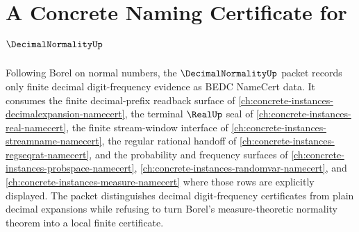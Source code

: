 \chapter{A Concrete Naming Certificate for $\DecimalNormalityUp$}
\label{ch:concrete-instances-decimalnormality-namecert}

Following Borel on normal numbers, the $\DecimalNormalityUp$ packet records
only finite decimal digit-frequency evidence as BEDC NameCert data. It consumes
the finite decimal-prefix readback surface of
\autoref{ch:concrete-instances-decimalexpansion-namecert}, the terminal
$\RealUp$ seal of \autoref{ch:concrete-instances-real-namecert}, the finite
stream-window interface of \autoref{ch:concrete-instances-streamname-namecert},
the regular rational handoff of
\autoref{ch:concrete-instances-regseqrat-namecert}, and the probability and
frequency surfaces of \autoref{ch:concrete-instances-probspace-namecert},
\autoref{ch:concrete-instances-randomvar-namecert}, and
\autoref{ch:concrete-instances-measure-namecert} where those rows are explicitly
displayed. The packet distinguishes decimal digit-frequency certificates from
plain decimal expansions while refusing to turn Borel's measure-theoretic
normality theorem into a local finite certificate.

